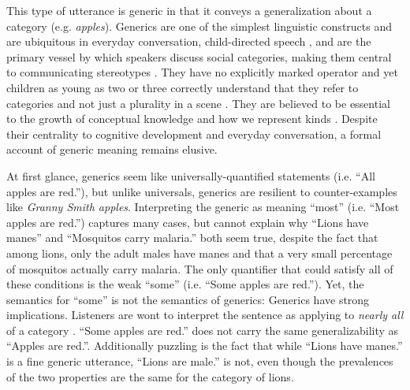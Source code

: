 \documentclass[10pt,letterpaper]{article}
\begin{document}
This type of utterance is generic \cite{Carlson1977, Leslie2008} in that it conveys a generalization about a category (e.g. \emph{apples}).  
Generics are one of the simplest linguistic constructs and are ubiquitous in everyday conversation, child-directed speech \cite{Gelman2008}, and are the primary vessel by which speakers discuss social categories, making them central to communicating stereotypes \cite{GelmanEtAl2004, Cimpian2010motivation, Leslie2015}.
They have no explicitly marked operator and yet children as young as two or three correctly understand that they refer to categories and not just a plurality in a scene \cite{Cimpian2008}. 
They are believed to be essential to the growth of conceptual knowledge \cite{Gelman2004} and how we represent kinds \cite{Leslie2008}.
Despite their centrality to cognitive development and everyday conversation, a formal account of generic meaning remains elusive.

At first glance, generics seem like universally-quantified statements (i.e. ``All apples are red.''), but unlike universals, generics are resilient to counter-examples like \emph{Granny Smith apples}. 
Interpreting the generic as meaning ``most'' (i.e. ``Most apples are red.'') captures many cases, but cannot explain why ``Lions have manes'' and ``Mosquitos carry malaria.'' both seem true, despite the fact that among lions, only the adult males have manes and that a very small percentage of mosquitos actually carry malaria.
The only quantifier that could satisfy all of these conditions is the weak ``some'' (i.e. ``Some apples are red.'').  
Yet, the semantics for ``some'' is not the semantics of generics:  Generics have strong implications. 
Listeners are wont to interpret the sentence as applying to \emph{nearly all} of a category \cite{Gelman2002, Cimpian2010}. 
``Some apples are red.'' does not carry the same generalizability as ``Apples are red.''.
Additionally puzzling is the fact that while ``Lions have manes.'' is a fine generic utterance, ``Lions are male.'' is not, even though the prevalences of the two properties are the same for the category of lions.

\end{document}
